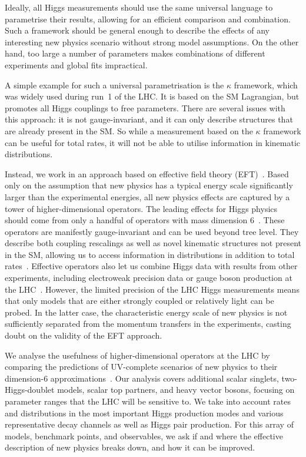 \newparagraph
%
Ideally, all Higgs measurements should use the same universal language
to parametrise their results, allowing for an efficient comparison
and combination. Such a framework should be general enough to describe
the effects of any interesting new physics scenario without strong model
assumptions. On the other hand, too large a number of parameters makes
combinations of different experiments and global fits impractical.

A simple example for such a universal parametrisation is the $\kappa$
framework, which was widely used during run~1 of the LHC. It is based
on the SM Lagrangian, but promotes all Higgs couplings to free
parameters. There are several issues with this approach: it is not
gauge-invariant, and it can only describe structures that are already
present in the SM. So while a measurement based on the $\kappa$
framework can be useful for total rates, it will not be able to
utilise information in kinematic distributions.

Instead, we work in an approach based on effective field theory
(EFT)~\cite{Coleman:1969sm, Callan:1969sn, Weinberg:1980wa}. Based
only on the assumption that new physics has a typical energy scale
significantly larger than the experimental energies, all new physics
effects are captured by a tower of higher-dimensional operators. The
leading effects for Higgs physics should come from only a handful of
operators with mass dimension 6~\cite{Burges:1983zg, Leung:1984ni,
  Buchmuller:1985jz}. These operators are manifestly gauge-invariant
and can be used beyond tree level. They describe both coupling
rescalings as well as novel kinematic structures not present in the
SM, allowing us to access information in distributions in addition to
total rates~\cite{Corbett:2012ja, Corbett:2015ksa}. Effective
operators also let us combine Higgs data with results from other
experiments, including electroweak precision data or gauge boson
production at the LHC~\cite{Butter:2016cvz}. However, the limited
precision of the LHC Higgs measurements means that only models that
are either strongly coupled or relatively light can be probed. In the
latter case, the characteristic energy scale of new physics is not
sufficiently separated from the momentum transfers in the experiments,
casting doubt on the validity of the EFT approach.

We analyse the usefulness of higher-dimensional operators at the LHC
by comparing the predictions of UV-complete scenarios of new physics
to their dimension-6 approximations~\cite{Brehmer:2015rna}. Our
analysis covers additional scalar singlets, two-Higgs-doublet models,
scalar top partners, and heavy vector bosons, focusing on parameter
ranges that the LHC will be sensitive to. We take into account rates
and distributions in the most important Higgs production modes and
various representative decay channels as well as Higgs pair
production. For this array of models, benchmark points, and
observables, we ask if and where the effective description of new
physics breaks down, and how it can be improved.

